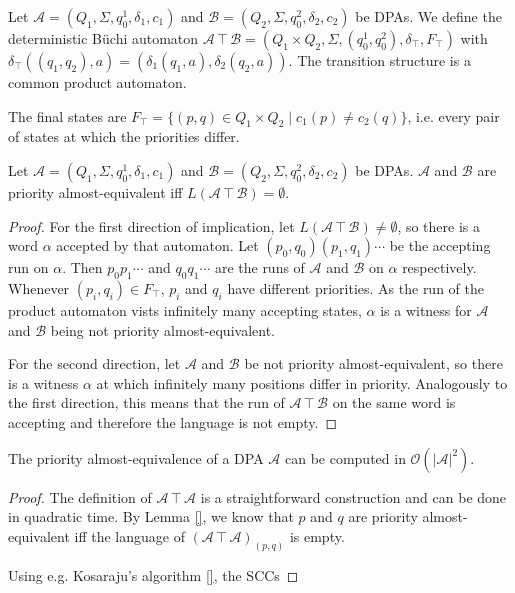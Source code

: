 \begin{defn}
	Let $\mathcal{A} = (Q_1, \Sigma, q^1_0, \delta_1, c_1)$ and $\mathcal{B} = (Q_2, \Sigma, q^2_0, \delta_2, c_2)$ be DPAs. We define the deterministic Büchi automaton $\mathcal{A} \intercal \mathcal{B} = (Q_1 \times Q_2, \Sigma, (q^1_0, q^2_0), \delta_\intercal, F_\intercal)$ with $\delta_\intercal((q_1, q_2), a) = (\delta_1(q_1, a), \delta_2(q_2, a))$. The transition structure is a common product automaton.
	
	The final states are $F_\intercal = \{ (p, q) \in Q_1 \times Q_2 \mid c_1(p) \neq c_2(q) \}$, i.e. every pair of states at which the priorities differ. 
\end{defn}

\begin{lem}
	Let $\mathcal{A} = (Q_1, \Sigma, q^1_0, \delta_1, c_1)$ and $\mathcal{B} = (Q_2, \Sigma, q^2_0, \delta_2, c_2)$ be DPAs. $\mathcal{A}$ and $\mathcal{B}$ are priority almost-equivalent iff $L(\mathcal{A} \intercal \mathcal{B}) = \emptyset$.
\end{lem}

\begin{proof}
	For the first direction of implication, let $L(\mathcal{A} \intercal \mathcal{B}) \neq \emptyset$, so there is a word $\alpha$ accepted by that automaton. Let $(p_0, q_0) (p_1, q_1) \cdots$ be the accepting run on $\alpha$. Then $p_0 p_1 \cdots$ and $q_0 q_1 \cdots$ are the runs of $\mathcal{A}$ and $\mathcal{B}$ on $\alpha$ respectively. Whenever $(p_i, q_i) \in F_\intercal$, $p_i$ and $q_i$ have different priorities. As the run of the product automaton vists infinitely many accepting states, $\alpha$ is a witness for $\mathcal{A}$ and $\mathcal{B}$ being not priority almost-equivalent.
	
	For the second direction, let $\mathcal{A}$ and $\mathcal{B}$ be not priority almost-equivalent, so there is a witness $\alpha$ at which infinitely many positions differ in priority. Analogously to the first direction, this means that the run of $\mathcal{A} \intercal \mathcal{B}$ on the same word is accepting and therefore the language is not empty.
\end{proof}

\begin{lem}
	The priority almost-equivalence of a DPA $\mathcal{A}$ can be computed in $\mathcal{O}(|\mathcal{A}|^2)$.
\end{lem}

\begin{proof}
	The definition of $\mathcal{A} \intercal \mathcal{A}$ is a straightforward construction and can be done in quadratic time. By Lemma \ref{}, we know that $p$ and $q$ are priority almost-equivalent iff the language of $(\mathcal{A} \intercal \mathcal{A})_{(p,q)}$ is empty. 

	Using e.g. Kosaraju's algorithm \ref{}, the SCCs %
\end{proof}


